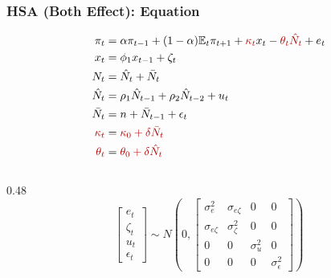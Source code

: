 \documentclass{beamer}
\begin{document}
\begin{frame}
  \frametitle{HSA (Both Effect): Equation}
    \begin{equation*}
    \begin{aligned}
        \pi_t &= \alpha \pi_{t-1} + (1-\alpha)\mathbb{E}_t \pi_{t+1} + {\color{red!70!black}\kappa_t} x_t - {\color{red!70!black}\theta_t \hat{N}_t} + e_t \\
        x_t &= \phi_1 x_{t-1} + \zeta_t \\
        N_t &= \hat{N}_t + \bar{N}_t \\
        \hat{N}_t &= \rho_1 \hat{N}_{t-1} + \rho_2 \hat{N}_{t-2} + u_t \\
        \bar{N}_t &= n + \bar{N}_{t-1} + \epsilon_t \\
        {\color{red!70!black}\kappa_t} &= {\color{red!70!black}\kappa_0 + \delta \bar{N}_t}\\
        {\color{red!70!black}\theta_t} &= {\color{red!70!black}\theta_0 + \delta \hat{N}_t}
    \end{aligned}
    \end{equation*}
  \begin{columns}[T,onlytextwidth]
    \begin{column}{0.48\textwidth}
      \centering
      \scriptsize
      \begin{equation*}
        \begin{bmatrix}
          e_t \\ \zeta_t \\ u_t \\ \epsilon_t
        \end{bmatrix}
        \sim N\!\left(
        0,
        \begin{bmatrix}
          \sigma_e^2 & \sigma_{e\zeta} & 0 & 0 \\
          \sigma_{e\zeta} & \sigma_\zeta^2 & 0 & 0 \\
          0 & 0 & \sigma_u^2 & 0 \\
          0 & 0 & 0 & \sigma_\epsilon^2
        \end{bmatrix}
        \right)
      \end{equation*}
    \end{column}


\end{columns}
\end{frame}
\end{document}
